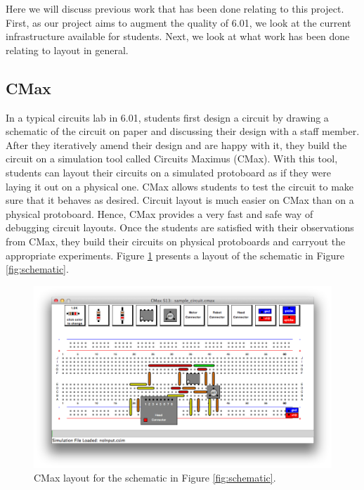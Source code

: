 Here we will discuss previous work that has been done relating to this project.
First, as our project aims to augment the quality of 6.01, we look at the
current infrastructure available for students. Next, we look at what work has
been done relating to layout in general.

\subsection{CMax}

In a typical circuits lab in 6.01, students first design a circuit by drawing a
schematic of the circuit on paper and discussing their design with a staff
member. After they iteratively amend their design and are happy with it, they
build the circuit on a simulation tool called Circuits Maximus (CMax). With this
tool, students can layout their circuits on a simulated protoboard as if they
were laying it out on a physical one. CMax allows students to test the circuit
to make sure that it behaves as desired. Circuit layout is much easier on CMax
than on a physical protoboard. Hence, CMax provides a very fast and safe way of
debugging circuit layouts. Once the students are satisfied with their
observations from CMax, they build their circuits on physical protoboards and
carryout the appropriate experiments. Figure \ref{fig:cmax_sample} presents a
layout of the schematic in Figure \ref{fig:schematic}.

\begin{figure}
\begin{center}
\includegraphics[width=\textwidth]{Images/sample_circuit.png}
\caption{CMax layout for the schematic in Figure \ref{fig:schematic}.}
\label{fig:cmax_sample}
\end{center}
\end{figure}

